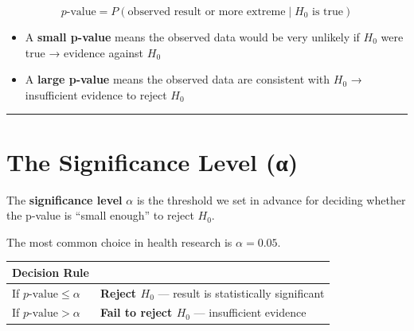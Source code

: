 \documentclass[
  12pt,
  letterpaper,
]{book}
\newcounter{none} %
\providecommand{\tightlist}{%
  \setlength{\itemsep}{0pt}\setlength{\parskip}{0pt}}
\begin{document}
\[p\text{-value} = P(\text{observed result or more extreme} \mid H_0 \text{ is true})\]

\begin{itemize}
\tightlist
\item
  A \textbf{small p-value} means the observed data would be very
  unlikely if \(H_0\) were true → evidence against \(H_0\)
\item
  A \textbf{large p-value} means the observed data are consistent with
  \(H_0\) → insufficient evidence to reject \(H_0\)
\end{itemize}

\begin{center}\rule{0.5\linewidth}{0.5pt}\end{center}

\section{The Significance Level (α)}\label{the-significance-level-ux3b1}

The \textbf{significance level} \(\alpha\) is the threshold we set in
advance for deciding whether the p-value is ``small enough'' to reject
\(H_0\).

The most common choice in health research is \(\alpha = 0.05\).

{\def\LTcaptype{none} %
\begin{longtable}[]{@{}
  >{\raggedright\arraybackslash}p{}
  >{\raggedright\arraybackslash}p{}@{}}
\toprule\noalign{}
\begin{minipage}[b]{\linewidth}\raggedright
Decision Rule
\end{minipage} & \begin{minipage}[b]{\linewidth}\raggedright
\end{minipage} \\
\midrule\noalign{}
\endhead
\bottomrule\noalign{}
\endlastfoot
If \(p\text{-value} \leq \alpha\) & \textbf{Reject \(H_0\)} --- result
is statistically significant \\
If \(p\text{-value} > \alpha\) & \textbf{Fail to reject \(H_0\)} ---
insufficient evidence \\
\end{longtable}
}
\end{document}
